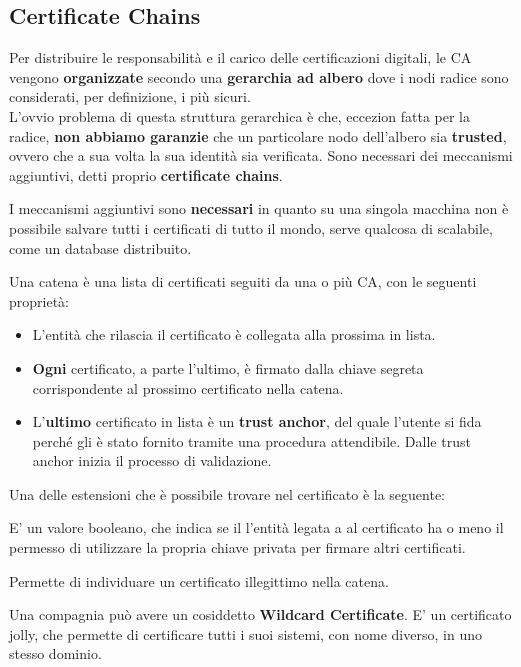\subsection{Certificate Chains}
Per distribuire le responsabilità e il carico delle certificazioni digitali, le CA vengono \textbf{organizzate} secondo una \textbf{gerarchia ad albero} dove i nodi radice sono considerati, per definizione, i più sicuri.\\
L'ovvio problema di questa struttura gerarchica è che, eccezion fatta per la radice, \textbf{non abbiamo garanzie} che un particolare nodo dell'albero sia \textbf{trusted}, ovvero che a sua volta la sua identità sia verificata. Sono necessari dei meccanismi aggiuntivi, detti proprio \textbf{certificate chains}.\\
\begin{remark}
I meccanismi aggiuntivi sono \textbf{necessari} in quanto su una singola macchina non è possibile salvare tutti i certificati di tutto il mondo, serve qualcosa di scalabile, come un database distribuito.
\end{remark}
\begin{definition}
Una catena è una lista di certificati seguiti da una o più CA, con le seguenti proprietà:
\begin{itemize}
    \item L'entità che rilascia il certificato è collegata alla prossima in lista. 
    \item \textbf{Ogni} certificato, a parte l'ultimo, è firmato dalla chiave segreta corrispondente al prossimo certificato nella catena.
    \item L'\textbf{ultimo} certificato in lista è un \textbf{trust anchor}, del quale l'utente si fida perché gli è stato fornito tramite una procedura attendibile. Dalle trust anchor inizia il processo di validazione.
\end{itemize}
\end{definition}
Una delle estensioni che è possibile trovare nel certificato è la seguente:
\begin{theorem}\label{thm:basiccons}
E' un valore booleano, che indica se il l'entità legata a al certificato ha o meno il permesso di utilizzare la propria chiave privata per firmare altri certificati.
\end{theorem}
\begin{remark}
Permette di individuare un certificato illegittimo nella catena.
\end{remark}
\begin{note}
Una compagnia può avere un cosiddetto \textbf{Wildcard Certificate}. E' un certificato jolly, che permette di certificare tutti i suoi sistemi, con nome diverso, in uno stesso dominio.
\end{note}\pagebreak
